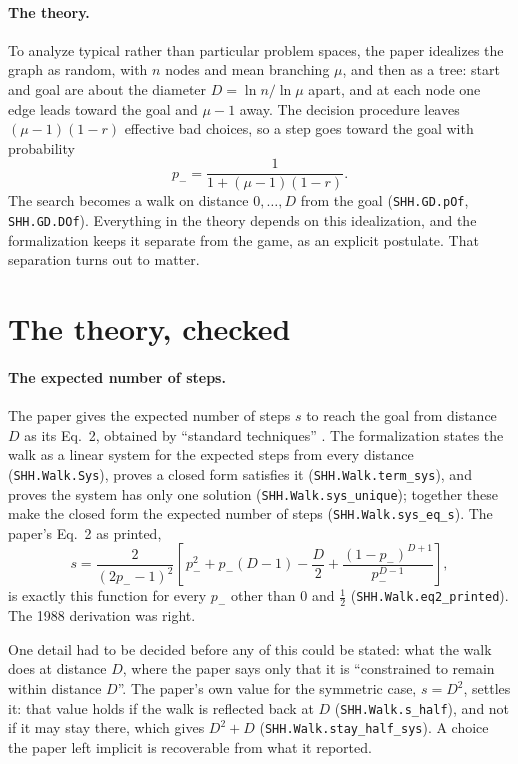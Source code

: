 \documentclass[11pt]{article}
\newcommand{\lean}[1]{\texttt{#1}}
\begin{document}
\paragraph{The theory.} To analyze typical rather than particular problem
spaces, the paper idealizes the graph as random, with $n$ nodes and mean
branching $\mu$, and then as a tree: start and goal are about the diameter
$D = \ln n/\ln\mu$ apart, and at each node one edge leads toward the goal
and $\mu - 1$ away. The decision procedure leaves $(\mu-1)(1-r)$ effective
bad choices, so a step goes toward the goal with probability
\begin{equation}
p_- = \frac{1}{1 + (\mu - 1)(1 - r)} .
\label{eq:pminus}
\end{equation}
The search becomes a walk on distance $0,\dots,D$ from the goal
(\lean{SHH.GD.pOf}, \lean{SHH.GD.DOf}). Everything in the theory depends
on this idealization, and the formalization keeps it separate from the
game, as an explicit postulate. That separation turns out to matter.

\section{The theory, checked}
\label{sec:theory}

\paragraph{The expected number of steps.} The paper gives the expected
number of steps $s$ to reach the goal from distance $D$ as its Eq.~2,
obtained by ``standard techniques'' \citep{vankampen1981}. The
formalization states the walk as a linear system for the expected steps
from every distance (\lean{SHH.Walk.Sys}), proves a closed form satisfies
it (\lean{SHH.Walk.term\_sys}), and proves the system has only one
solution (\lean{SHH.Walk.sys\_unique}); together these make the closed form
the expected number of steps (\lean{SHH.Walk.sys\_eq\_s}). The paper's Eq.~2
as printed,
\[
s = \frac{2}{(2p_- - 1)^2}\left[\,p_-^2 + p_-(D-1) - \frac{D}{2} + \frac{(1-p_-)^{D+1}}{p_-^{D-1}}\right],
\]
is exactly this function for every $p_-$ other than $0$ and $\tfrac12$
(\lean{SHH.Walk.eq2\_printed}). The 1988 derivation was right.

One detail had to be decided before any of this could be stated: what the
walk does at distance $D$, where the paper says only that it is
``constrained to remain within distance $D$''. The paper's own value for the
symmetric case, $s = D^2$, settles it: that value holds if the walk is
reflected back at $D$ (\lean{SHH.Walk.s\_half}), and not if it may stay
there, which gives $D^2 + D$ (\lean{SHH.Walk.stay\_half\_sys}). A choice the
paper left implicit is recoverable from what it reported.
\end{document}
